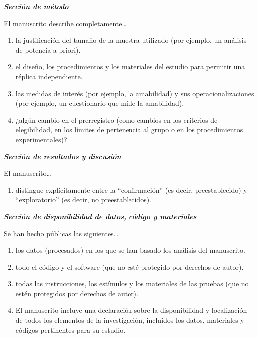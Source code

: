 \documentclass[
  spanish,
  letterpaper,
  DIV=11,
  numbers=noendperiod]{scrreprt}
\providecommand{\tightlist}{%
  \setlength{\itemsep}{0pt}\setlength{\parskip}{0pt}}
\begin{document}
\textbf{\emph{Sección de método}}

El manuscrito describe completamente\ldots{}

\begin{enumerate}
\def\labelenumi{(\arabic{enumi})}
\setcounter{enumi}{3}
\item
  la justificación del tamaño de la muestra utilizado (por ejemplo, un
  análisis de potencia a priori).
\item
  el diseño, los procedimientos y los materiales del estudio para
  permitir una réplica independiente.
\item
  las medidas de interés (por ejemplo, la amabilidad) y sus
  operacionalizaciones (por ejemplo, un cuestionario que mide la
  amabilidad).
\item
  ¿algún cambio en el prerregistro (como cambios en los criterios de
  elegibilidad, en los límites de pertenencia al grupo o en los
  procedimientos experimentales)?
\end{enumerate}

\textbf{\emph{Sección de resultados y discusión}}

El manuscrito\ldots{}

\begin{enumerate}
\def\labelenumi{(\arabic{enumi})}
\setcounter{enumi}{7}
\tightlist
\item
  distingue explícitamente entre la ``confirmación'' (es decir,
  preestablecido) y ``exploratorio'' (es decir, no preestablecidos).
\end{enumerate}

\textbf{\emph{Sección de disponibilidad de datos, código y materiales}}

Se han hecho públicas las siguientes\ldots{}

\begin{enumerate}
\def\labelenumi{(\arabic{enumi})}
\setcounter{enumi}{8}
\item
  los datos (procesados) en los que se han basado los análisis del
  manuscrito.
\item
  todo el código y el software (que no esté protegido por derechos de
  autor).
\item
  todas las instrucciones, los estímulos y los materiales de las pruebas
  (que no estén protegidos por derechos de autor).
\item
  El manuscrito incluye una declaración sobre la disponibilidad y
  localización de todos los elementos de la investigación, incluidos los
  datos, materiales y códigos pertinentes para su estudio.
\end{enumerate}
\end{document}
